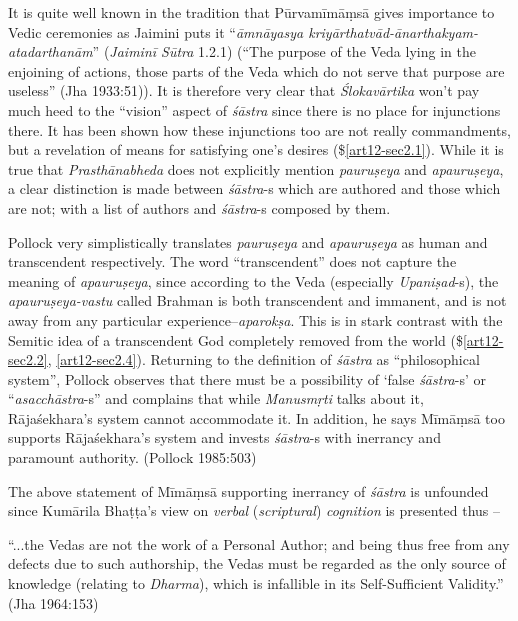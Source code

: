 It is quite well known in the tradition that Pūrvamīmāṃsā gives importance to Vedic ceremonies as Jaimini puts it ``{\sl āmnāyasya kriyārthatvād-ānarthakyam-atadarthanām}'' ({\sl Jaiminī Sūtra} 1.2.1) (``The purpose of the Veda lying in the enjoining of actions, those parts of the Veda which do not serve that purpose are useless'' (Jha 1933:51)). It is therefore very clear that {\sl Ślokavārtika} won't pay much heed to the ``vision'' aspect of {\sl śāstra} since there is no place for injunctions there. It has been shown how these injunctions too are not really commandments, but a revelation of means for satisfying one's desires (\$\ref{art12-sec2.1}). While it is true that {\sl Prasthānabheda} does not explicitly mention {\sl pauruṣeya} and {\sl apauruṣeya}, a clear distinction is made between {\sl śāstra}-s which are authored and those which are not; with a list of authors and {\sl śāstra}-s composed by them. 

Pollock very simplistically translates {\sl pauruṣeya} and {\sl apauruṣeya}  as human and transcendent respectively. The word ``transcendent'' does not capture the meaning of {\sl apauruṣeya}, since according to the Veda (especially {\sl Upaniṣad}-s), the {\sl apauruṣeya-vastu} called Brahman is both transcendent and immanent, and is not away from any particular experience--{\sl aparokṣa}. This is in stark contrast with the Semitic idea of a transcendent God completely removed from the world (\$\ref{art12-sec2.2}, \ref{art12-sec2.4}). Returning to the deﬁnition of {\sl śāstra} as ``philosophical system'', Pollock observes that there must be a possibility of `false {\sl śāstra}-s' or ``{\sl asacchāstra}-s'' and complains that while {\sl Manusmṛti} talks about it, Rājaśekhara's system cannot accommodate it. In addition, he says Mīmāṃsā too supports Rājaśekhara's system and invests {\sl śāstra}-s with inerrancy and paramount authority. (Pollock 1985:503)

The above statement of Mīmāṃsā supporting inerrancy of {\sl śāstra} is unfounded since Kumārila Bhaṭṭa's view on {\sl verbal} ({\sl scriptural}) {\sl cognition} is presented thus --
\begin{myquote}
“...the Vedas are not the work of a Personal Author; and being thus free from any defects due to such authorship, the Vedas must be regarded as the only source of knowledge (relating to {\sl Dharma}), which is infallible in its Self-Suﬃcient Validity.'' (Jha 1964:153)
\end{myquote}

